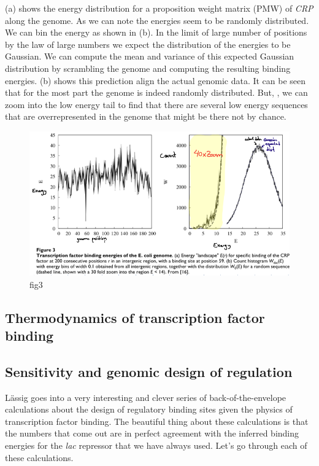 (a) shows the energy distribution for a proposition
weight matrix (PMW) of {\it CRP} along the genome. As we can note the energies
seem to be randomly distributed. We can bin the energy as shown in
(b). In the limit of large number of positions by the
law of large numbers we expect the distribution of the energies to be Gaussian.
We can compute the mean and variance of this expected Gaussian distribution by
scrambling the genome and computing the resulting binding energies.
(b) shows this prediction align the actual genomic
data. It can be seen that for the most part the genome is indeed randomly
distributed. But, , we
can zoom into the low energy tail to find that there are several low energy
sequences that are overrepresented in the genome that might be there not by
chance.

\begin{figure}[h!]
	\centering \includegraphics[scale=0.5]{../fig/lassig_2007/fig3.png}
	\caption{fig3}
  \label{fig_tf_binding_ecoli}
\end{figure}

\subsection{Thermodynamics of transcription factor binding}

\subsection{Sensitivity and genomic design of regulation}
L\"{a}ssig goes into a very interesting and clever series of back-of-the-envelope
calculations about the design of regulatory binding sites given the physics of
transcription factor binding. The beautiful thing about these calculations is
that the numbers that come out are in perfect agreement with the inferred
binding energies for the {\it lac} repressor that we have always used. Let's go
through each of these calculations.

